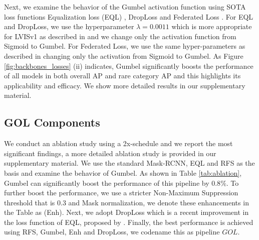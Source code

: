 \documentclass[runningheads]{llncs}
\begin{document}
Next, we examine the behavior of the Gumbel activation function using SOTA loss functions Equalization loss (EQL) \cite{tan2020equalization}, DropLoss \cite{hsieh2021droploss} and Federated Loss \cite{zhou2021probablistic}. For EQL and DropLoss, we use the hyperparameter $\lambda=0.0011$ which is more appropriate for LVISv1 as described in \cite{tan2021equalization} and we change only the activation function from Sigmoid to Gumbel. For Federated Loss, we use the same hyper-parameters as described in \cite{zhou2021probablistic} changing only the activation from Sigmoid to Gumbel. As Figure  \ref{fig:backbones_losses} (ii) indicates, Gumbel significantly boosts the performance of all models in both overall AP and rare category AP and this highlights its applicability and efficacy. 
We show more detailed results in our supplementary material.
















\subsection{GOL Components}
We conduct an ablation study using a 2x-schedule and we report the most significant findings, a more detailed ablation study is provided in our supplementary material.
We use the standard Mask-RCNN, EQL \cite{tan2020equalization} and RFS \cite{gupta2019lvis} as the basis and examine the behavior of Gumbel.
As shown in Table \ref{tab:ablation}, Gumbel can significantly boost the performance of this pipeline by $0.8\%$. To further boost the performance, we use a stricter Non-Maximum Suppression threshold that is $0.3$ and Mask normalization, we denote these enhancements in the Table as (Enh). Next, we adopt DropLoss which is a recent improvement in the loss function of EQL, proposed by \cite{hsieh2021droploss}.
Finally, the best performance is achieved using RFS, Gumbel, Enh and DropLoss, we codename this as pipeline $GOL$. 
\end{document}

